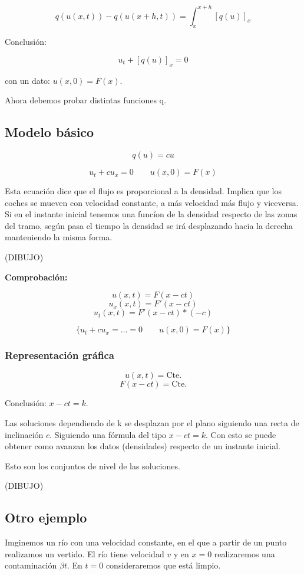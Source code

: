 \documentclass[palatino]{apuntes}
\begin{document}
$$ q(u(x,t)) - q(u(x+h,t)) = \int^{x+h}_{x} [q(u)]_{x} $$

Conclusión:

$$ u_t + [q(u)]_{x} = 0$$

con un dato: $u(x, 0) = F(x)$.

Ahora debemos probar distintas funciones q.


\subsection{Modelo básico}

$$q(u) = cu$$ 

$$u_t + cu_x = 0 \quad\quad u(x,0) = F(x)$$


Esta ecuación dice que el flujo es proporcional a la densidad. Implica que los coches se mueven con velocidad constante, a más velocidad más flujo y viceversa. Si en el instante inicial tenemos una funcíon de la densidad respecto de las zonas del tramo, según pasa el tiempo la densidad se irá desplazando hacia la derecha manteniendo la misma forma.

(DIBUJO)

\textbf{Comprobación:}

$$ u(x,t) = F(x-ct) $$
$$ u_x(x,t) = F'(x-ct)$$
$$u_t(x,t) = F'(x-ct)*(-c)$$

$$ \{ u_t + cu_x = … = 0 \quad\quad u(x,0) = F(x) \} $$

\subsubsection{Representación gráfica}


$$u(x,t) = \text{Cte.}$$
$$F(x - ct) = \text{Cte.}$$

Conclusión: $x-ct = k$.


Las soluciones dependiendo de k se desplazan por el plano siguiendo una recta de inclinación $c$. Siguiendo una fórmula del tipo $x-ct = k$. Con esto se puede obtener como avanzan los datos (densidades) respecto de un instante inicial.

Esto son los conjuntos de nivel de las soluciones.

(DIBUJO)



\subsection{Otro ejemplo}

Imginemos un río con una velocidad constante, en el que a partir de un punto realizamos un vertido. El río tiene velocidad $v$ y en $x=0$ realizaremos una contaminación $\beta{t}$. En $t=0$ consideraremos que está limpio.
\end{document}
